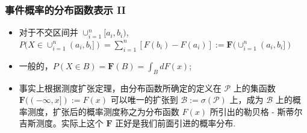 \begin{frame}
	\frametitle{事件概率的分布函数表示 II}

	\begin{itemize}[<+-|alert@+>]
		\item 对于不交区间并 $\cup_{i=1}^n [a_i,b_i)$, $P (X\in \cup_{i=1}^n (a_i,b_i])=\sum_{i=1}^n [F (b_i)-F (a_i)]:=\mathbf{F}(\cup_{i=1}^n (a_i,b_i])$
		\item 一般的，$P (X\in B)=\mathbf{F}(B)=\int_BdF (x)$;
		\item 事实上根据测度扩张定理，由分布函数所确定的定义在 $\mathcal{P}$ 上的集函数 $\mathbf{F}((-\infty, x]):=F (x)$ 可以唯一的扩张到 $\mathcal{B}:=\sigma (\mathcal{P})$ 上，成为 $\mathcal{B}$ 上的概率测度，扩张后的概率测度称之为分布函数 $F (x)$ 所引出的勒贝格 - 斯蒂尔吉斯测度。实际上这个 $\mathbf{F}$ 正好是我们前面引进的概率分布.

	\end{itemize}
\end{frame}






